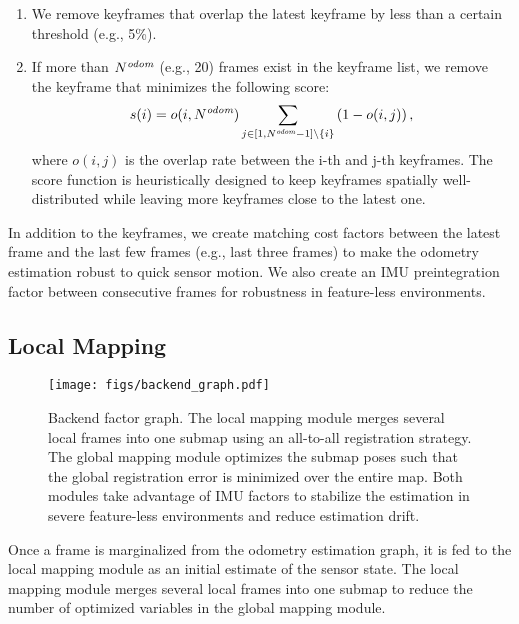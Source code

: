 \documentclass[letterpaper, 10 pt, conference]{ieeeconf}  %
\begin{document}
\begin{enumerate}
  \item We remove keyframes that overlap the latest keyframe by less than a certain threshold (e.g., 5\%).
  \item If more than $N^{\text{\it odom}}$ (e.g., 20) frames exist in the keyframe list, we remove the keyframe that minimizes the following score:
    \begin{align}
      s(i) = o(i, N^{\text{\it odom}}) \sum_{j \in [1, N^{\text{\it odom}}-1] \backslash \{i\}} \left( 1 - o(i, j) \right),
    \end{align}
    where $o(i, j)$ is the overlap rate between the i-th and j-th keyframes. The score function is heuristically designed to keep keyframes spatially well-distributed while leaving more keyframes close to the latest one.
\end{enumerate}

In addition to the keyframes, we create matching cost factors between the latest frame and the last few frames (e.g., last three frames) to make the odometry estimation robust to quick sensor motion. We also create an IMU preintegration factor between consecutive frames for robustness in feature-less environments. 

\subsection{Local Mapping}
\label{sec:local_mapping}

\begin{figure}[tb]
  \centering
  \texttt{[image: figs/backend\_graph.pdf]}
  \caption{Backend factor graph. The local mapping module merges several local frames into one submap using an all-to-all registration strategy. The global mapping module optimizes the submap poses such that the global registration error is minimized over the entire map. Both modules take advantage of IMU factors to stabilize the estimation in severe feature-less environments and reduce estimation drift.}
  \label{fig:backend_graph}
\end{figure}

Once a frame is marginalized from the odometry estimation graph, it is fed to the local mapping module as an initial estimate of the sensor state. The local mapping module merges several local frames into one submap to reduce the number of optimized variables in the global mapping module.
\end{document}
